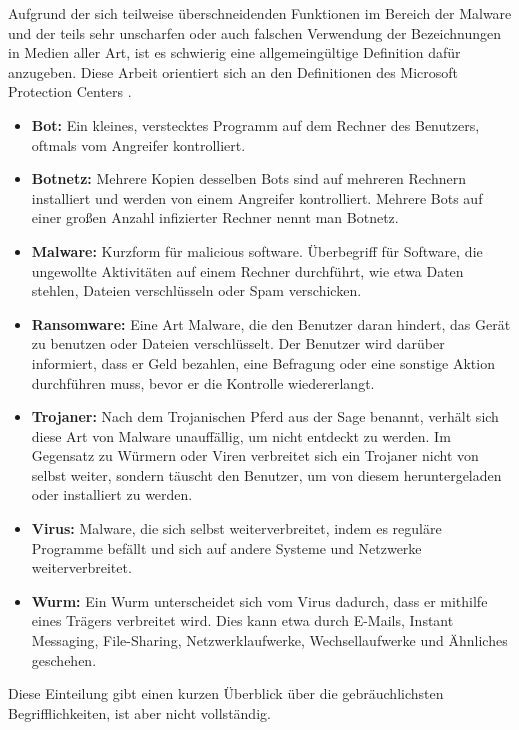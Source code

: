 Aufgrund der sich teilweise überschneidenden Funktionen im Bereich der Malware und der teils sehr unscharfen oder auch falschen Verwendung der Bezeichnungen in Medien aller Art, ist es schwierig eine allgemeingültige Definition dafür anzugeben. Diese Arbeit orientiert sich an den Definitionen des Microsoft Protection Centers \cite{malware_pc}.

		\begin{itemize}
			\item \textbf{Bot:} Ein kleines, verstecktes Programm auf dem Rechner des Benutzers, oftmals vom Angreifer kontrolliert.
			\item \textbf{Botnetz:} Mehrere Kopien des­sel­ben Bots sind auf mehreren Rechnern installiert und werden von einem Angreifer kontrolliert. Mehrere Bots auf einer großen Anzahl infizierter Rechner nennt man Botnetz.
			\item \textbf{Malware:}	Kurzform für \glqq malicious software\grqq. Überbegriff für Software, die ungewollte Aktivitäten auf einem Rechner durchführt, wie etwa Daten stehlen, Dateien verschlüsseln oder Spam verschicken.
			\item \textbf{Ransomware:} Eine Art Malware, die den Benutzer daran hindert, das Gerät zu benutzen oder Dateien verschlüsselt. Der Benutzer wird darüber informiert, dass er Geld bezahlen, eine Befragung oder eine sonstige Aktion durchführen muss, bevor er die Kontrolle wiedererlangt.
			\item \textbf{Trojaner:} Nach dem Trojanischen Pferd aus der Sage benannt, verhält sich diese Art von Malware unauffällig, um nicht entdeckt zu werden. Im Gegensatz zu Würmern oder Viren verbreitet sich ein Trojaner nicht von selbst weiter, sondern täuscht den Benutzer, um von diesem heruntergeladen oder installiert zu werden.
			\item \textbf{Virus:} Malware, die sich selbst weiterverbreitet, indem es reguläre Programme befällt und sich auf andere Systeme und Netzwerke weiterverbreitet.
			\item \textbf{Wurm:} Ein Wurm unterscheidet sich vom Virus dadurch, dass er mithilfe eines Trägers verbreitet wird. Dies kann etwa durch E-Mails, Instant Messaging, File-Sharing, Netzwerklaufwerke, Wechsellaufwerke und Ähnliches geschehen.
		\end{itemize}
Diese Einteilung gibt einen kurzen Überblick über die gebräuchlichsten Begrifflichkeiten, ist aber nicht vollständig.